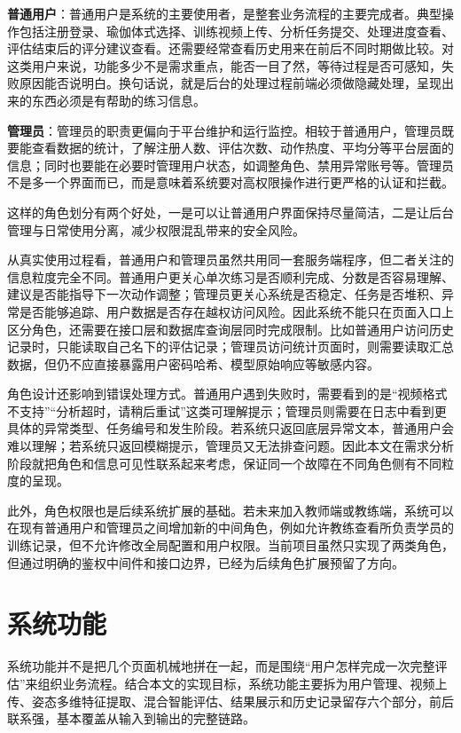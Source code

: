 \documentclass[UTF8,twoside]{ctexrep}
\makeatletter
\def@NAT@last@yr{\@citea}%
\def@NAT@last@yr{-\NAT@penalty}%
\makeatother
\begin{document}
\textbf{普通用户}：普通用户是系统的主要使用者，是整套业务流程的主要完成者。典型操作包括注册登录、瑜伽体式选择、训练视频上传、分析任务提交、处理进度查看、评估结束后的评分建议查看。还需要经常查看历史用来在前后不同时期做比较。对这类用户来说，功能多少不是需求重点，能否一目了然，等待过程是否可感知，失败原因能否说明白。换句话说，就是后台的处理过程前端必须做隐藏处理，呈现出来的东西必须是有帮助的练习信息。

\textbf{管理员}：管理员的职责更偏向于平台维护和运行监控。相较于普通用户，管理员既要能查看数据的统计，了解注册人数、评估次数、动作热度、平均分等平台层面的信息；同时也要能在必要时管理用户状态，如调整角色、禁用异常账号等。管理员不是多一个界面而已，而是意味着系统要对高权限操作进行更严格的认证和拦截。

这样的角色划分有两个好处，一是可以让普通用户界面保持尽量简洁，二是让后台管理与日常使用分离，减少权限混乱带来的安全风险。

从真实使用过程看，普通用户和管理员虽然共用同一套服务端程序，但二者关注的信息粒度完全不同。普通用户更关心单次练习是否顺利完成、分数是否容易理解、建议是否能指导下一次动作调整；管理员更关心系统是否稳定、任务是否堆积、异常是否能够追踪、用户数据是否存在越权访问风险。因此系统不能只在页面入口上区分角色，还需要在接口层和数据库查询层同时完成限制。比如普通用户访问历史记录时，只能读取自己名下的评估记录；管理员访问统计页面时，则需要读取汇总数据，但仍不应直接暴露用户密码哈希、模型原始响应等敏感内容。

角色设计还影响到错误处理方式。普通用户遇到失败时，需要看到的是“视频格式不支持”“分析超时，请稍后重试”这类可理解提示；管理员则需要在日志中看到更具体的异常类型、任务编号和发生阶段。若系统只返回底层异常文本，普通用户会难以理解；若系统只返回模糊提示，管理员又无法排查问题。因此本文在需求分析阶段就把角色和信息可见性联系起来考虑，保证同一个故障在不同角色侧有不同粒度的呈现。

此外，角色权限也是后续系统扩展的基础。若未来加入教师端或教练端，系统可以在现有普通用户和管理员之间增加新的中间角色，例如允许教练查看所负责学员的训练记录，但不允许修改全局配置和用户权限。当前项目虽然只实现了两类角色，但通过明确的鉴权中间件和接口边界，已经为后续角色扩展预留了方向。

\section{系统功能}

系统功能并不是把几个页面机械地拼在一起，而是围绕“用户怎样完成一次完整评估”来组织业务流程。结合本文的实现目标，系统功能主要拆为用户管理、视频上传、姿态多维特征提取、混合智能评估、结果展示和历史记录留存六个部分，前后联系强，基本覆盖从输入到输出的完整链路。
\end{document}
